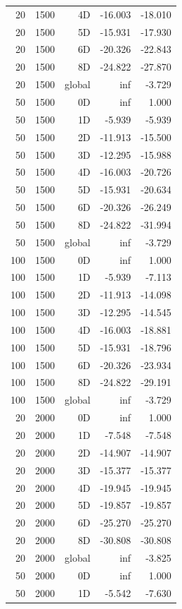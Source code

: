 \begin{longtable}{rrrrr}
20 & 1500 & 4D & -16.003 & -18.010 \\
20 & 1500 & 5D & -15.931 & -17.930 \\
20 & 1500 & 6D & -20.326 & -22.843 \\
20 & 1500 & 8D & -24.822 & -27.870 \\
20 & 1500 & global & inf & -3.729 \\
50 & 1500 & 0D & inf & 1.000 \\
50 & 1500 & 1D & -5.939 & -5.939 \\
50 & 1500 & 2D & -11.913 & -15.500 \\
50 & 1500 & 3D & -12.295 & -15.988 \\
50 & 1500 & 4D & -16.003 & -20.726 \\
50 & 1500 & 5D & -15.931 & -20.634 \\
50 & 1500 & 6D & -20.326 & -26.249 \\
50 & 1500 & 8D & -24.822 & -31.994 \\
50 & 1500 & global & inf & -3.729 \\
100 & 1500 & 0D & inf & 1.000 \\
100 & 1500 & 1D & -5.939 & -7.113 \\
100 & 1500 & 2D & -11.913 & -14.098 \\
100 & 1500 & 3D & -12.295 & -14.545 \\
100 & 1500 & 4D & -16.003 & -18.881 \\
100 & 1500 & 5D & -15.931 & -18.796 \\
100 & 1500 & 6D & -20.326 & -23.934 \\
100 & 1500 & 8D & -24.822 & -29.191 \\
100 & 1500 & global & inf & -3.729 \\
20 & 2000 & 0D & inf & 1.000 \\
20 & 2000 & 1D & -7.548 & -7.548 \\
20 & 2000 & 2D & -14.907 & -14.907 \\
20 & 2000 & 3D & -15.377 & -15.377 \\
20 & 2000 & 4D & -19.945 & -19.945 \\
20 & 2000 & 5D & -19.857 & -19.857 \\
20 & 2000 & 6D & -25.270 & -25.270 \\
20 & 2000 & 8D & -30.808 & -30.808 \\
20 & 2000 & global & inf & -3.825 \\
50 & 2000 & 0D & inf & 1.000 \\
50 & 2000 & 1D & -5.542 & -7.630 \\

\end{longtable}

